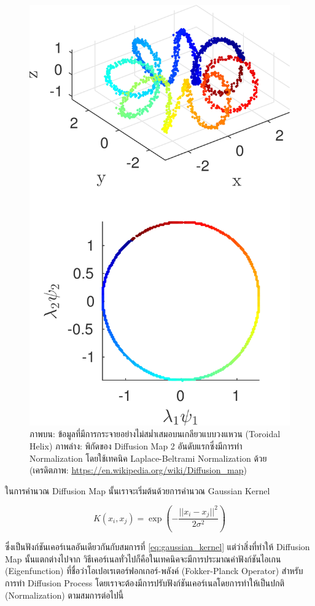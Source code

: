 \begin{figure}[htbp]
    \centering
    \includegraphics[width=0.6\linewidth]{fig/diffusion_map.jpg}
    \caption{ภาพบน: ข้อมูลที่มีการกระจายอย่างไม่สม่ำเสมอบนเกลียวแบบวงแหวน (Toroidal Helix) ภาพล่าง: พิกัดของ Diffusion Map 
    2 อันดับแรกซึ่งมีการทำ Normalization โดยใช้เทคนิค Laplace-Beltrami Normalization ด้วย
    (เครดิตภาพ: \url{https://en.wikipedia.org/wiki/Diffusion_map})}
    \label{fig:diffusion_map}
\end{figure}

ในการคำนวณ Diffusion Map นั้นเราจะเริ่มต้นด้วยการคำนวณ Gaussian Kernel

\begin{equation}
    K(x_{i}, x_{j}) = \exp \left( -\frac{||x_i-x_j||^2}{2\sigma^2} \right)
\end{equation}

\noindent ซึ่งเป็นฟังก์ชันเคอร์เนลอันเดียวกันกับสมการที่ \ref{eq:gaussian_kernel} แต่ว่าสิ่งที่ทำให้ Diffusion Map นั้นแตกต่างไปจาก%
วิธีเคอร์เนลทั่วไปก็คือในเทคนิคจะมีการประมาณค่าฟังก์ชันไอเกน (Eigenfunction) ที่ชื่อว่าโอเปอเรเตอร์ฟอกเกอร์-พลังค์ (Fokker-Planck 
Operator) สำหรับการทำ Diffusion Process\autocite{trstanova2020} โดยเราจะต้องมีการปรับฟังก์ชันเคอร์เนลโดยการทำให้เป็นปกติ 
(Normalization)\autocite{nadler2006} ตามสมการต่อไปนี้

